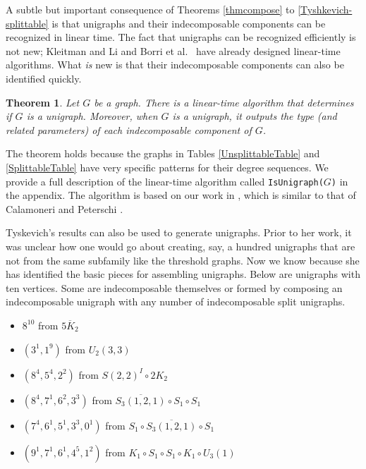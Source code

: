 \documentclass[11pt]{article}
\newtheorem{theorem}[df]{Theorem}
\begin{document}




A subtle but important consequence of Theorems \ref{thmcompose} to \ref{Tyshkevich-splittable} is that unigraphs and their indecomposable components can be recognized in linear time.  The fact that unigraphs can be recognized efficiently is not new; Kleitman and Li \cite{KL75}  and Borri et al.~\cite{Borri2011} have already designed linear-time algorithms.   What {\it is} new is that their indecomposable components  can also be identified quickly.  

\begin{theorem}
Let $G$ be a graph.  There is a linear-time algorithm that determines if $G$ is a unigraph.  Moreover, when $G$ is a unigraph, it outputs the type (and related parameters) of each indecomposable component of $G$.
\end{theorem}

  The theorem holds because the graphs in Tables \ref{UnsplittableTable} and  \ref{SplittableTable} have very specific patterns for their degree sequences.  We provide a full description of the linear-time algorithm called {\tt IsUnigraph($G$)} in the appendix.   The algorithm is based on our work in \cite{Ch25}, which is similar to that of Calamoneri and Peterschi \cite{CaPe11}. %

 
 Tyskevich's results can also be used to generate unigraphs. 
Prior to her work, it was unclear how one would go about creating, say, a hundred unigraphs that are not from the same subfamily like the threshold graphs.  Now we know because she has identified the  basic pieces  for assembling unigraphs.   Below are unigraphs with ten vertices.  Some are indecomposable themselves or formed by composing an  indecomposable unigraph with any number of indecomposable split unigraphs.  %

\begin{itemize}
\item $8^{10}$  from $\overline{5 K_2}$
\item $(3^1 , 1^9)$ from $U_2(3,3)$
\item  $(8^4 , 5^4 , 2^2)$  from $S(2,2)^I \circ 2K_2$
\item   $(8^4 , 7^1 , 6^2 , 3^3)$ from $\overline{S_3(1,2,1)}  \circ S_1 \circ S_1$   
\item $(7^4 , 6^1 , 5^1 , 3^3 , 0^1)$ from $S_1 \circ \overline{S_3(1,2,1)}  \circ S_1$
\item $(9^1 , 7^1 , 6^1 , 4^5 , 1^2)$ from $K_1 \circ S_1 \circ S_1 \circ K_1 \circ U_3(1)$ 
\end{itemize}
\end{document}
